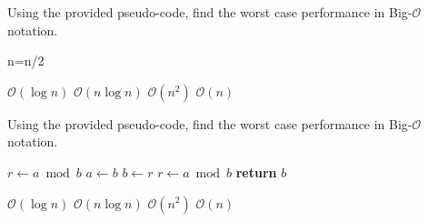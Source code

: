 \documentclass{exam}
\begin{document}
\begin{questions}
\question Using the provided pseudo-code, find the worst case performance in Big-$\mathcal{O}$ notation.
        \begin{algorithm}[H]
        \caption{Some more messy pseudocode}\label{algor4}
            \begin{algorithmic}[1]
                        \State n=n/2
                    \EndWhile
                \EndProcedure
            \end{algorithmic}
        \end{algorithm}
    \begin{choices}
        \CorrectChoice $\mathcal{O}(\log n)$
        \choice $\mathcal{O}(n\log n)$
        \choice $\mathcal{O}(n^{2})$
        \choice $\mathcal{O}(n)$
    \end{choices}


\question Using the provided pseudo-code, find the worst case performance in Big-$\mathcal{O}$ notation.
    \begin{algorithm}[H]
    \caption{Euclid’s algorithm}
        \label{euclid}
        \begin{algorithmic}[1] %
             
                \State $r\gets a \bmod b$
                 
                    \State $a \gets b$
                    \State $b \gets r$
                    \State $r \gets a \bmod b$
                \EndWhile\label{euclidendwhile}
                \State \textbf{return} $b$
            \EndProcedure
        \end{algorithmic}
    \end{algorithm}
    \begin{choices}
        \choice $\mathcal{O}(\log n)$
        \choice $\mathcal{O}(n\log n)$
        \choice $\mathcal{O}(n^{2})$
        \CorrectChoice $\mathcal{O}(n)$
    \end{choices}


\end{questions}
\end{document}
